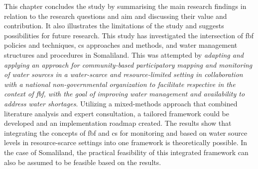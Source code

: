 This chapter concludes the study by summarising the main research findings in relation to the research questions and aim and discussing their value and contribution. It also illustrates the limitations of the study and suggests possibilities for future research.\newline
This study has investigated the intersection of \acrlong{fbf} policies and techniques, \acrlong{cs} approaches and methods, and water management structures and procedures in Somaliland. This was attempted by \textit{adapting and applying an approach for community-based participatory mapping and monitoring of water sources in a water-scarce and resource-limited setting in collaboration with a national non-governmental organization to facilitate respective  in the context of \acrlong{fbf}, with the goal of improving water management and availability to address water shortages}. Utilizing a mixed-methods approach that combined literature analysis and expert consultation, a tailored framework could be developed and an implementation roadmap created. The results show that integrating the concepts of \acrlong{fbf} and \acrlong{cs} for monitoring and  based on water source levels in resource-scarce settings into one framework is theoretically possible. In the case of Somaliland, the practical feasibility of this integrated framework can also be assumed to be feasible based on the results.\newline %
